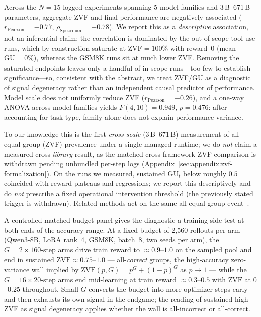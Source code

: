 \documentclass{article}
\begin{document}
Across the $N = 15$ logged experiments spanning 5 model families and
3\,B--671\,B parameters, aggregate ZVF and final performance are negatively
associated ($r_{\text{Pearson}} = -0.77$, $\rho_{\text{Spearman}} = -0.78$). We
report this as a \emph{descriptive} association, not an inferential claim: the
correlation is dominated by the out-of-scope tool-use runs, which by
construction saturate at $\mathrm{ZVF} = 100\%$ with reward~$0$ (mean
$\mathrm{GU} = 0\%$), whereas the GSM8K runs sit at much lower ZVF. Removing the
saturated endpoints leaves only a handful of in-scope runs---too few to
establish significance---so, consistent with the abstract, we treat ZVF/GU as a
diagnostic of signal degeneracy rather than an independent causal predictor of
performance. Model scale does not uniformly reduce ZVF
($r_\text{Pearson} = -0.26$), and a one-way ANOVA across model families yields
$F(4,10) = 0.949$, $p = 0.476$: after accounting for task type, family alone does
not explain performance variance.

To our knowledge this is the first \emph{cross-scale} (3\,B--671\,B) measurement
of all-equal-group (ZVF) prevalence under a single managed runtime; we do
\emph{not} claim a measured cross-\emph{library} result, as the matched
cross-framework ZVF comparison is withdrawn pending unbundled per-step logs
(Appendix~\ref{sec:appendix:zvf-formalization}). On the runs we measured,
sustained $\mathrm{GU}_t$ below roughly $0.5$ coincided with reward plateaus and
regressions; we report this descriptively and do \emph{not} prescribe a fixed
operational intervention threshold (the previously stated trigger is
withdrawn). Related methods act on the same all-equal-group
event~\cite{zhang2026greso}.

A controlled matched-budget panel gives the diagnostic a training-side
test at both ends of the accuracy range. At a fixed budget of 2{,}560
rollouts per arm (Qwen3-8B, LoRA rank~4, GSM8K, batch~8, two seeds per
arm), the $G{=}2\times160$-step arms drive train reward to
$\approx0.9$--$1.0$ on the sampled pool and end in sustained
$\mathrm{ZVF}\approx0.75$--$1.0$ ---
all-\emph{correct} groups, the high-accuracy zero-variance wall implied
by $\mathrm{ZVF}(p,G)=p^G+(1-p)^G$ as $p\to1$ --- while the
$G{=}16\times20$-step arms end mid-learning at train reward
$\approx0.3$--$0.5$ with $\mathrm{ZVF}$ at $0$--$0.25$ throughout. Small $G$ converts the
budget into more optimizer steps early and then exhausts its own signal
in the endgame; the reading of sustained high ZVF as signal degeneracy
applies whether the wall is all-incorrect or all-correct.
\end{document}
